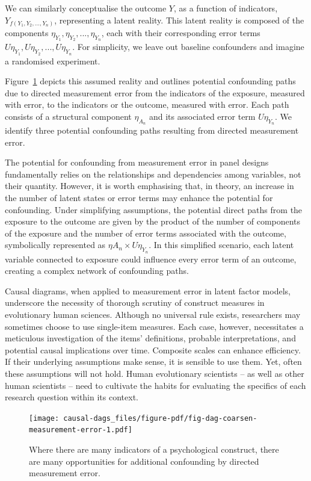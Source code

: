 \documentclass[
  singlecolumn]{article}
\begin{document}
We can similarly conceptualise the outcome \(Y\), as a function of
indicators, \(Y_{f(Y_1, Y_2, ..., Y_n)}\), representing a latent
reality. This latent reality is composed of the components
\(\eta_{Y_1}, \eta_{Y_2}, ..., \eta_{Y_n}\), each with their
corresponding error terms
\(U\eta_{Y_1}, U\eta_{Y_2}, ..., U\eta_{Y_n}\). For simplicity, we leave
out baseline confounders and imagine a randomised experiment.

Figure~\ref{fig-dag-coarsen-measurement-error} depicts this assumed
reality and outlines potential confounding paths due to directed
measurement error from the indicators of the exposure, measured with
error, to the indicators or the outcome, measured with error. Each path
consists of a structural component \(\eta_{A_n}\) and its associated
error term \(U\eta_{Y_n}\). We identify three potential confounding
paths resulting from directed measurement error.

The potential for confounding from measurement error in panel designs
fundamentally relies on the relationships and dependencies among
variables, not their quantity. However, it is worth emphasising that, in
theory, an increase in the number of latent states or error terms may
enhance the potential for confounding. Under simplifying assumptions,
the potential direct paths from the exposure to the outcome are given by
the product of the number of components of the exposure and the number
of error terms associated with the outcome, symbolically represented as
\(\eta A_n \times U\eta_{Y_n}\). In this simplified scenario, each
latent variable connected to exposure could influence every error term
of an outcome, creating a complex network of confounding paths.

Causal diagrams, when applied to measurement error in latent factor
models, underscore the necessity of thorough scrutiny of construct
measures in evolutionary human sciences. Although no universal rule
exists, researchers may sometimes choose to use single-item measures.
Each case, however, necessitates a meticulous investigation of the
items' definitions, probable interpretations, and potential causal
implications over time. Composite scales can enhance efficiency. If
their underlying assumptions make sense, it is sensible to use them.
Yet, often these assumptions will not hold. Human evolutionary
scientists -- as well as other human scientists -- need to cultivate the
habits for evaluating the specifics of each research question within its
context.

\begin{figure}

{\centering \texttt{[image: causal-dags\_files/figure-pdf/fig-dag-coarsen-measurement-error-1.pdf]}

}

\caption{\label{fig-dag-coarsen-measurement-error}Where there are many
indicators of a psychological construct, there are many opportunities
for additional confounding by directed measurement error.}

\end{figure}
\end{document}
